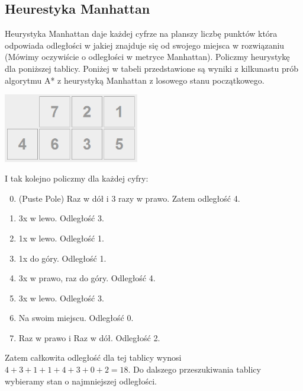 \documentclass{classrep}
\begin{document}
\subsection{Heurestyka Manhattan}
Heurystyka Manhattan daje każdej cyfrze na planszy liczbę punktów która odpowiada odległości w jakiej znajduje się od swojego miejsca w rozwiązaniu (Mówimy oczywiście o odległości w metryce Manhattan). Policzmy heurystykę dla poniższej tablicy. Poniżej w tabeli przedstawione są wyniki z kilkunastu prób algorytmu A* z heurystyką Manhattan z losowego stanu początkowego.
\begin{center}
	\includegraphics[height=3cm]{2x4unsolvable.png}
\end{center}
I tak kolejno policzmy dla każdej cyfry:
\begin{enumerate}
  \setcounter{enumi}{-1}
  \item (Puste Pole) Raz w dół i 3 razy w prawo. Zatem odległość 4.
  \item 3x w lewo. Odległość 3.
  \item 1x w lewo. Odległość 1.
  \item 1x do góry. Odległość 1.
  \item 3x w prawo, raz do góry. Odległość 4.
  \item 3x w lewo. Odległość 3.
  \item Na swoim miejscu. Odległość 0.
  \item Raz w prawo i Raz w dół. Odległość 2.
\end{enumerate}
Zatem całkowita odległość dla tej tablicy wynosi $4+3+1+1+4+3+0+2=18$. Do dalszego przeszukiwania tablicy wybieramy stan o najmniejszej odległości.
\end{document}
